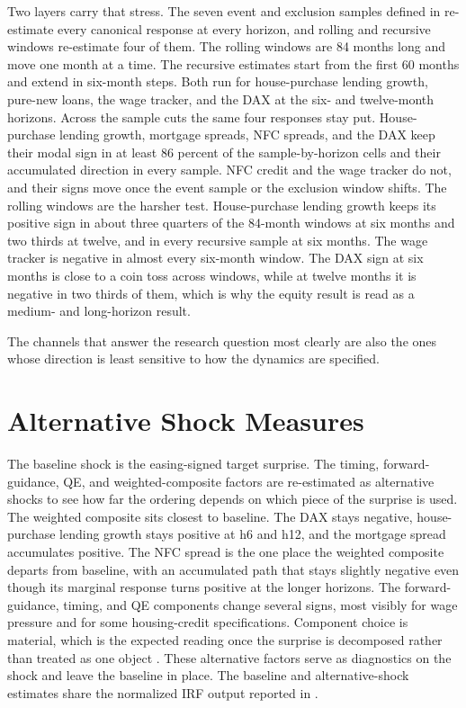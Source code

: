Two layers carry that stress. The seven event and exclusion samples defined in  re-estimate every canonical response at every horizon, and rolling and recursive windows re-estimate four of them. The rolling windows are 84 months long and move one month at a time. The recursive estimates start from the first 60 months and extend in six-month steps. Both run for house-purchase lending growth, pure-new loans, the wage tracker, and the DAX at the six- and twelve-month horizons. Across the sample cuts the same four responses stay put. House-purchase lending growth, mortgage spreads, NFC spreads, and the DAX keep their modal sign in at least 86 percent of the sample-by-horizon cells and their accumulated direction in every sample. NFC credit and the wage tracker do not, and their signs move once the event sample or the exclusion window shifts. The rolling windows are the harsher test. House-purchase lending growth keeps its positive sign in about three quarters of the 84-month windows at six months and two thirds at twelve, and in every recursive sample at six months. The wage tracker is negative in almost every six-month window. The DAX sign at six months is close to a coin toss across windows, while at twelve months it is negative in two thirds of them, which is why the equity result is read as a medium- and long-horizon result.

The channels that answer the research question most clearly are also the ones whose direction is least sensitive to how the dynamics are specified.

\section{Alternative Shock Measures}

The baseline shock is the easing-signed target surprise. The timing, forward-guidance, QE, and weighted-composite factors are re-estimated as alternative shocks to see how far the ordering depends on which piece of the surprise is used. The weighted composite sits closest to baseline. The DAX stays negative, house-purchase lending growth stays positive at h6 and h12, and the mortgage spread accumulates positive. The NFC spread is the one place the weighted composite departs from baseline, with an accumulated path that stays slightly negative even though its marginal response turns positive at the longer horizons. The forward-guidance, timing, and QE components change several signs, most visibly for wage pressure and for some housing-credit specifications. Component choice is material, which is the expected reading once the surprise is decomposed rather than treated as one object \parencite{JarocinskiKaradi2020}. These alternative factors serve as diagnostics on the shock and leave the baseline in place. The baseline and alternative-shock estimates share the normalized IRF output reported in .

